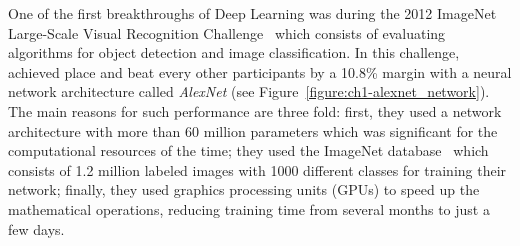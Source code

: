 One of the first breakthroughs of Deep Learning was during the 2012 ImageNet Large-Scale Visual Recognition Challenge~\cite{ILSVRC15} which consists of evaluating algorithms for object detection and image classification.
In this challenge, \citet{krizhevsky2012imagenet} achieved  place and beat every other participants by a 10.8\% margin with a neural network architecture called \emph{AlexNet} (see Figure~\ref{figure:ch1-alexnet_network}). 
The main reasons for such performance are three fold: first, they used a network architecture with more than 60 million parameters which was significant for the computational resources of the time; they used the ImageNet database~\cite{imagenet_cvpr09} which consists of 1.2 million labeled images with 1000 different classes for training their network; finally, they used graphics processing units (GPUs) to speed up the mathematical operations, reducing training time from several months to just a few days. 

